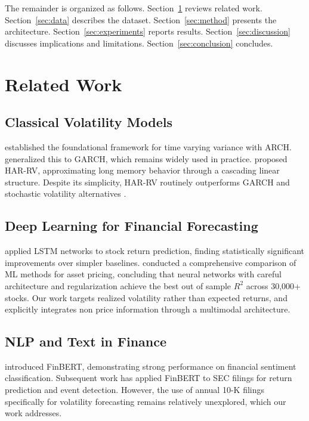 \documentclass[10pt, twocolumn, a4paper]{article}
\begin{document}
The remainder is organized as follows. Section~\ref{sec:related} reviews
related work. Section~\ref{sec:data} describes the dataset.
Section~\ref{sec:method} presents the architecture.
Section~\ref{sec:experiments} reports results.
Section~\ref{sec:discussion} discusses implications and limitations.
Section~\ref{sec:conclusion} concludes.


\section{Related Work}
\label{sec:related}

\subsection{Classical Volatility Models}

\citet{engle1982autoregressive} established the foundational framework for
time varying variance with ARCH. \citet{bollerslev1986generalized} generalized
this to GARCH, which remains widely used in practice. \citet{corsi2009simple}
proposed HAR{-}RV, approximating long memory behavior through a cascading
linear structure. Despite its simplicity, HAR{-}RV routinely outperforms
GARCH and stochastic volatility alternatives
\citep{patton2011volatility}.

\subsection{Deep Learning for Financial Forecasting}

\citet{fischer2018deep} applied LSTM networks to stock return prediction,
finding statistically significant improvements over simpler baselines.
\citet{gu2020empirical} conducted a comprehensive comparison of ML methods
for asset pricing, concluding that neural networks with careful architecture
and regularization achieve the best out of sample $R^2$ across 30{,}000+
stocks. Our work targets realized volatility rather than expected returns,
and explicitly integrates non price information through a multimodal
architecture.

\subsection{NLP and Text in Finance}

\citet{yang2020finbert} introduced FinBERT, demonstrating strong performance
on financial sentiment classification. Subsequent work has applied FinBERT
to SEC filings for return prediction and event detection. However, the use
of annual 10{-}K filings specifically for volatility forecasting remains
relatively unexplored, which our work addresses.
\end{document}
